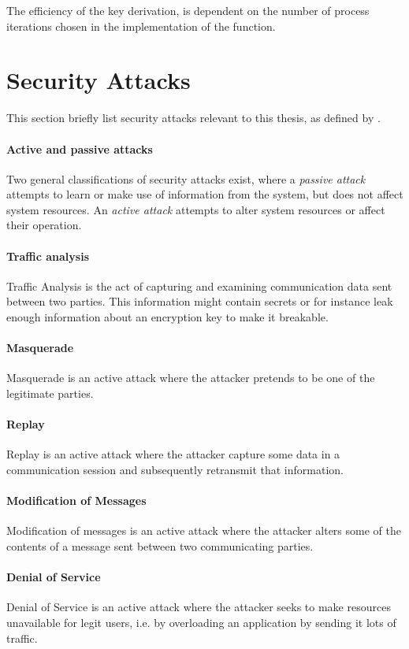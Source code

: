 \documentclass[pdftex,english,10pt,b5paper,twoside]{book}
\begin{document}
The efficiency of the key derivation, is dependent on the number of process
iterations chosen in the implementation of the function.

\section{Security Attacks}

This section briefly list security attacks relevant to this thesis, as defined
by \citet[Ch. 1.3]{stallings}.

\paragraph{Active and passive attacks} Two general classifications of security
attacks exist, where a \emph{passive attack} attempts to learn or make use of
information from the system, but does not affect system resources. An
\emph{active attack} attempts to alter system resources or affect their
operation.

\paragraph{Traffic analysis} Traffic Analysis is the act of capturing and
examining communication data sent between two parties. This information might
contain secrets or for instance leak enough information about an encryption key
to make it breakable.

\paragraph{Masquerade} Masquerade is an active attack where the attacker pretends to be
one of the legitimate parties.

\paragraph{Replay} Replay is an active attack where the attacker capture some
data in a communication session and subsequently retransmit that information.

\paragraph{Modification of Messages} Modification of messages is an active
attack where the attacker alters some of the contents of a message sent between
two communicating parties.

\paragraph{Denial of Service} Denial of Service is an active attack where the
attacker seeks to make resources unavailable for legit users, i.e. by
overloading an application by sending it lots of traffic.
\end{document}
